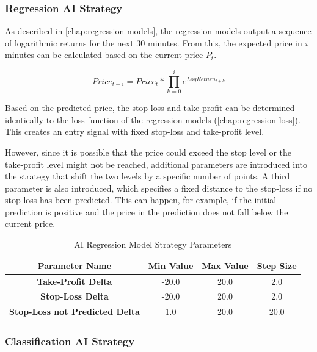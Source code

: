 \subsubsection{Regression AI Strategy}
\label{chap:regression-ai-stategy}

As described in \autoref{chap:regression-models}, the regression models output a sequence of logarithmic returns for the next 30 minutes.
From this, the expected price in $i$ minutes can be calculated based on the current price $P_t$.

\[
    Price_{t+i} = Price_t * \prod_{k=0}^{i} e^{LogReturn_{t+k}}
\]

Based on the predicted price, the stop-loss and take-profit can be determined identically to the loss-function of the regression models (\autoref{chap:regression-loss}).
This creates an entry signal with fixed stop-loss and take-profit level.

However, since it is possible that the price could exceed the stop level or the take-profit level might not be reached, additional parameters are introduced into the strategy that shift the two levels by a specific number of points.
A third parameter is also introduced, which specifies a fixed distance to the stop-loss if no stop-loss has been predicted.
This can happen, for example, if the initial prediction is positive and the price in the prediction does not fall below the current price.

\begin{table}[H]
    \centering
    \begin{tabular}{cccc}
        \toprule
        Parameter Name & Min Value & Max Value & Step Size
        \\
        \midrule
        \textbf{Take-Profit Delta}             & -20.0 & 20.0 & 2.0  \\
        \textbf{Stop-Loss Delta}               & -20.0 & 20.0 & 2.0  \\
        \textbf{Stop-Loss not Predicted Delta} & 1.0   & 20.0 & 20.0 \\
        \bottomrule
    \end{tabular}
    \caption{AI Regression Model Strategy Parameters}
    \label{tbl:regression-strategy-parameters}
\end{table}

\subsubsection{Classification AI Strategy}

